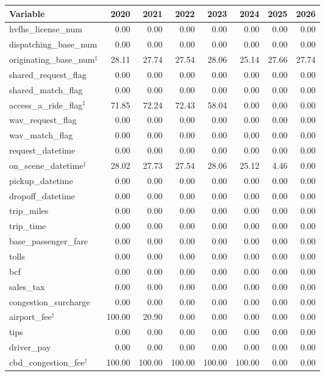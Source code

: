 \begin{tabular}{lrrrrrrr}
\toprule
Variable & 2020 & 2021 & 2022 & 2023 & 2024 & 2025 & 2026 \\
\midrule
hvfhs\_license\_num & 0.00 & 0.00 & 0.00 & 0.00 & 0.00 & 0.00 & 0.00 \\
dispatching\_base\_num & 0.00 & 0.00 & 0.00 & 0.00 & 0.00 & 0.00 & 0.00 \\
originating\_base\_num$^{\ddagger}$ & 28.11 & 27.74 & 27.54 & 28.06 & 25.14 & 27.66 & 27.74 \\
shared\_request\_flag & 0.00 & 0.00 & 0.00 & 0.00 & 0.00 & 0.00 & 0.00 \\
shared\_match\_flag & 0.00 & 0.00 & 0.00 & 0.00 & 0.00 & 0.00 & 0.00 \\
access\_a\_ride\_flag$^{\ddagger}$ & 71.85 & 72.24 & 72.43 & 58.04 & 0.00 & 0.00 & 0.00 \\
wav\_request\_flag & 0.00 & 0.00 & 0.00 & 0.00 & 0.00 & 0.00 & 0.00 \\
wav\_match\_flag & 0.00 & 0.00 & 0.00 & 0.00 & 0.00 & 0.00 & 0.00 \\
request\_datetime & 0.00 & 0.00 & 0.00 & 0.00 & 0.00 & 0.00 & 0.00 \\
on\_scene\_datetime$^{\ddagger}$ & 28.02 & 27.73 & 27.54 & 28.06 & 25.12 & 4.46 & 0.00 \\
pickup\_datetime & 0.00 & 0.00 & 0.00 & 0.00 & 0.00 & 0.00 & 0.00 \\
dropoff\_datetime & 0.00 & 0.00 & 0.00 & 0.00 & 0.00 & 0.00 & 0.00 \\
trip\_miles & 0.00 & 0.00 & 0.00 & 0.00 & 0.00 & 0.00 & 0.00 \\
trip\_time & 0.00 & 0.00 & 0.00 & 0.00 & 0.00 & 0.00 & 0.00 \\
base\_passenger\_fare & 0.00 & 0.00 & 0.00 & 0.00 & 0.00 & 0.00 & 0.00 \\
tolls & 0.00 & 0.00 & 0.00 & 0.00 & 0.00 & 0.00 & 0.00 \\
bcf & 0.00 & 0.00 & 0.00 & 0.00 & 0.00 & 0.00 & 0.00 \\
sales\_tax & 0.00 & 0.00 & 0.00 & 0.00 & 0.00 & 0.00 & 0.00 \\
congestion\_surcharge & 0.00 & 0.00 & 0.00 & 0.00 & 0.00 & 0.00 & 0.00 \\
airport\_fee$^{\dagger}$ & 100.00 & 20.90 & 0.00 & 0.00 & 0.00 & 0.00 & 0.00 \\
tips & 0.00 & 0.00 & 0.00 & 0.00 & 0.00 & 0.00 & 0.00 \\
driver\_pay & 0.00 & 0.00 & 0.00 & 0.00 & 0.00 & 0.00 & 0.00 \\
cbd\_congestion\_fee$^{\dagger}$ & 100.00 & 100.00 & 100.00 & 100.00 & 100.00 & 0.00 & 0.00 \\
\bottomrule
\end{tabular}
